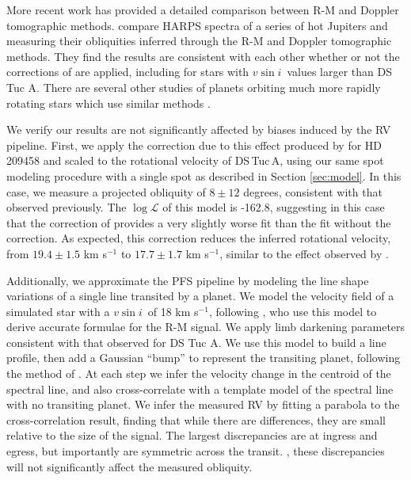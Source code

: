 \documentclass[twocolumn]{aastex63}
\newcommand{\vsini}{{$v \sin i$}}
\begin{document}
More recent work has provided a detailed comparison between R-M and Doppler tomographic methods. \citet{Brown17} compare HARPS spectra of a series of hot Jupiters and measuring their obliquities inferred through the R-M and Doppler tomographic methods. 
They find the results are consistent with each other whether or not the corrections of \citet{Hirano10} are applied, including for stars with \vsini\ values larger than DS Tuc A. There are several other studies of planets orbiting much more rapidly rotating stars which use similar methods \citep[e.g.][]{Triaud09, Gandolfi10}.

We verify our results are not significantly affected by biases induced by the RV pipeline. First, we apply the correction due to this effect produced by \citet{Winn05} for HD 209458 and scaled to the rotational velocity of DS\,Tuc\,A, using our same spot modeling procedure with a single spot as described in Section \ref{sec:model}. In this case, we measure a projected obliquity of $8 \pm 12$ degrees, consistent with that observed previously. 
The $\log\mathcal{L}$ of this model is -162.8, suggesting in this case that the correction of \citet{Winn05} provides a very slightly worse fit than the fit without the correction. As expected, this correction reduces the inferred rotational velocity, from $19.4 \pm 1.5$ km s$^{-1}$ to $17.7 \pm 1.7$ km s$^{-1}$, similar to the effect observed by \citet{Brown17}. 

Additionally, we approximate the PFS pipeline by modeling the line shape variations of a single line transited by a planet. We model the velocity field of a simulated star with a \vsini\ of 18 km s$^{-1}$, following \citet{Short18}, who use this model to derive accurate formulae for the R-M signal. We apply limb darkening parameters consistent with that observed for DS Tuc A. We use this model to build a line profile, then add a Gaussian ``bump'' to represent the transiting planet, following the method of \citet{CollierCameron10}. At each step we infer the velocity change in the centroid of the spectral line, and also cross-correlate with a template model of the spectral line with no transiting planet. We infer the measured RV by fitting a parabola to the cross-correlation result, finding that while there are differences, they are small relative to the size of the signal. The largest discrepancies are at ingress and egress, but importantly are symmetric across the transit. , these discrepancies will not significantly affect the measured obliquity. 
\end{document}

